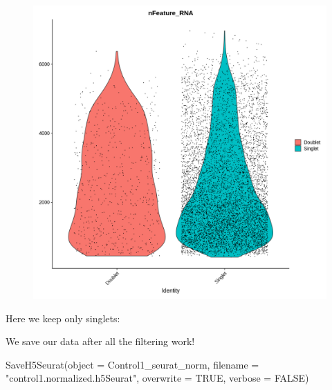\documentclass[
  letterpaper,
  DIV=11,
  numbers=noendperiod]{scrartcl}
\newenvironment{Shaded}{\begin{snugshade}}{\end{snugshade}}
\newcommand{\AttributeTok}[1]{\textcolor[rgb]{0.49,0.56,0.16}{#1}}
\newcommand{\ConstantTok}[1]{\textcolor[rgb]{0.53,0.00,0.00}{#1}}
\newcommand{\DecValTok}[1]{\textcolor[rgb]{0.25,0.63,0.44}{#1}}
\newcommand{\FunctionTok}[1]{\textcolor[rgb]{0.02,0.16,0.49}{#1}}
\newcommand{\NormalTok}[1]{\textcolor[rgb]{0.00,0.44,0.13}{#1}}
\newcommand{\OtherTok}[1]{\textcolor[rgb]{0.00,0.44,0.13}{#1}}
\newcommand{\SpecialCharTok}[1]{\textcolor[rgb]{0.25,0.44,0.63}{#1}}
\newcommand{\StringTok}[1]{\textcolor[rgb]{0.25,0.44,0.63}{#1}}
\begin{document}
\begin{figure}[H]

{\centering \includegraphics{notebook_files/figure-pdf/cell-42-output-1.png}

}

\end{figure}

Here we keep only singlets:

\begin{Shaded}
\end{Shaded}

We save our data after all the filtering work!

\begin{Shaded}
\begin{Highlighting}[]
\FunctionTok{SaveH5Seurat}\NormalTok{(}\AttributeTok{object =}\NormalTok{ Control1\_seurat\_norm, }
             \AttributeTok{filename =} \StringTok{"control1.normalized.h5Seurat"}\NormalTok{, }
             \AttributeTok{overwrite =} \ConstantTok{TRUE}\NormalTok{,}
             \AttributeTok{verbose =} \ConstantTok{FALSE}\NormalTok{)}
\end{Highlighting}
\end{Shaded}
\end{document}
